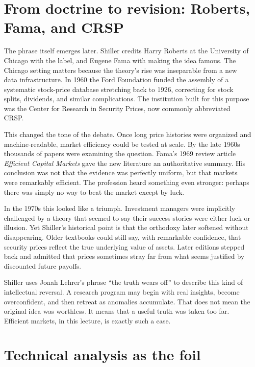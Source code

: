 \section{From doctrine to revision: Roberts, Fama, and CRSP}

The phrase itself emerges later. Shiller credits Harry Roberts at the University of Chicago with the label, and Eugene Fama with making the idea famous. The Chicago setting matters because the theory's rise was inseparable from a new data infrastructure. In 1960 the Ford Foundation funded the assembly of a systematic stock-price database stretching back to 1926, correcting for stock splits, dividends, and similar complications. The institution built for this purpose was the Center for Research in Security Prices, now commonly abbreviated CRSP.

This changed the tone of the debate. Once long price histories were organized and machine-readable, market efficiency could be tested at scale. By the late 1960s thousands of papers were examining the question. Fama's 1969 review article \emph{Efficient Capital Markets} gave the new literature an authoritative summary. His conclusion was not that the evidence was perfectly uniform, but that markets were remarkably efficient. The profession heard something even stronger: perhaps there was simply no way to beat the market except by luck.

In the 1970s this looked like a triumph. Investment managers were implicitly challenged by a theory that seemed to say their success stories were either luck or illusion. Yet Shiller's historical point is that the orthodoxy later softened without disappearing. Older textbooks could still say, with remarkable confidence, that security prices reflect the true underlying value of assets. Later editions stepped back and admitted that prices sometimes stray far from what seems justified by discounted future payoffs.

Shiller uses Jonah Lehrer's phrase ``the truth wears off'' to describe this kind of intellectual reversal. A research program may begin with real insights, become overconfident, and then retreat as anomalies accumulate. That does not mean the original idea was worthless. It means that a useful truth was taken too far. Efficient markets, in this lecture, is exactly such a case.

\section{Technical analysis as the foil}

